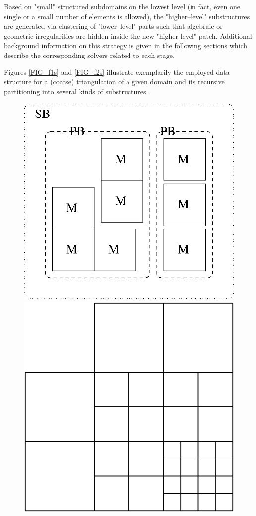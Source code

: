 Based on "small" structured subdomains on the lowest level (in fact, even one single or a small number of 
elements is allowed), the "higher--level" substructures are generated via clustering of "lower--level" 
parts such that algebraic or 
geometric irregularities are hidden inside the new "higher-level" patch. Additional background information
on this strategy is given in the following sections which describe the corresponding 
solvers related to each stage.

Figures \ref{FIG_f1s} and \ref{FIG_f2s} illustrate exemplarily the employed data structure for a (coarse) triangulation of a 
given domain and its recursive partitioning into several kinds of substructures.

\begin{figure}[htbp]
\begin{center}
\includegraphics[scale=0.4]{../psfiles/ds1.eps} \hspace*{1cm} \includegraphics[scale=0.6]{../psfiles/ds2.eps}

\end{center}
\end{figure}
